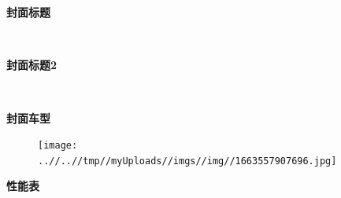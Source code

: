 \documentclass[a4paper,twoside,fontset=windows]{article}
\begin{document}
 \par\vspace{0.3cm}\begin{minipage}[H]{0.12\paperwidth}~\end{minipage}\begin{minipage}{\linewidth}\end{minipage}\par\vspace{1.5cm}\begin{minipage}[H]{0.1\paperwidth}~\end{minipage}{\fontsize{54pt}{\baselineskip}\textbf{封面标题}}\\\par\begin{minipage}[H]{0.1\paperwidth}~\end{minipage}{\fontsize{54pt}{\baselineskip}\textbf{封面标题2}\par\vspace{2.35cm}}{\begin{minipage}[H]{0.13\paperwidth}~\end{minipage}\fontsize{36pt}{\baselineskip}\textbf{封面车型}\par\vspace{3cm}}\begin{minipage}[H]{\paperwidth}\begin{figure}[H]\centering\texttt{[image: ..//..//tmp//myUploads//imgs//img//1663557907696.jpg]}\end{figure}\end{minipage}\par\vspace{2.5cm}{\color{red}\rule{\paperwidth}{8pt}}\begin{center}{\fontsize{20pt}{\baselineskip}\textbf{性能表}}\end{center}\restoregeometry\clearpage\hbox{}\clearpage
 \pagestyle{qianyan}
\end{document}
